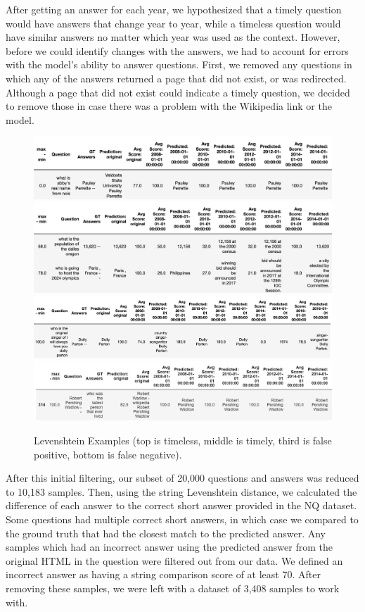 \documentclass{article}
\begin{document}
After getting an answer for each year, we hypothesized that a timely question
would have answers that change year to year, while a timeless question would
have similar answers no matter which year was used as the context. However,
before we could identify changes with the answers, we had to account for errors
with the model’s ability to answer questions. First, we removed any questions in
which any of the answers returned a page that did not exist, or was redirected.
Although a page that did not exist could indicate a timely question, we decided
to remove those in case there was a problem with the Wikipedia link or the
model. \begin{figure}[ht]
	\begin{center}
		\includegraphics[width=5in]{timeless leven.png}
		\includegraphics[width=5in]{timely leven.png}
		\includegraphics[width=5in]{leven false pos.png}
		\includegraphics[width=5in]{leven_false_neg.PNG}
	\end{center}
	\caption{Levenshtein Examples (top is timeless, middle is timely, third is false positive, bottom is false negative).}
	\label{fig:levenshtein_examples}
\end{figure}

After this initial filtering, our subset of 20,000 questions and answers was
reduced to 10,183 samples. Then, using the string Levenshtein distance, we
calculated the difference of each answer to the correct short answer provided in
the NQ dataset. Some questions had multiple correct short answers, in which case
we compared to the ground truth that had the closest match to the predicted
answer. Any samples which had an incorrect answer using the predicted answer
from the original HTML in the question were filtered out from our data. We
defined an incorrect answer as having a string comparison score of at least 70.
After removing these samples, we were left with a dataset of 3,408 samples to
work with.
\end{document}

